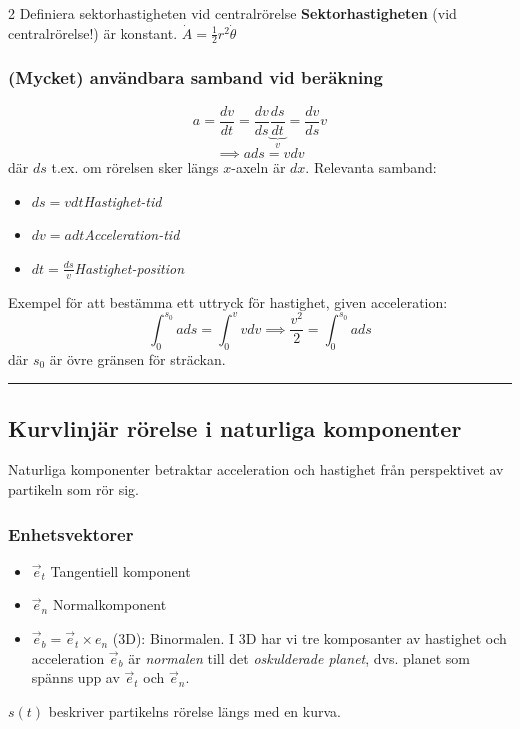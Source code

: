 \documentclass{article}
\newenvironment{ankiflashcard}[1][ ]{}{}
\newcommand{\ruler}{
\rule{0.5\textwidth}{0.5pt}
}
\begin{document}
\begin{paracol}{2}
\begin{ankiflashcard}{Definiera sektorhastigheten vid centralrörelse}
    \textbf{Sektorhastigheten} (vid centralrörelse!) är konstant.
    $\dot A = \frac 1 2 r^2 \dot \theta$
\end{ankiflashcard}
\switchcolumn
\subsubsection{(Mycket) användbara samband vid beräkning}
$$
a=\frac{dv}{dt}=\frac{dv}{ds}\underbrace{\frac{ds}{dt}}_{v} = \frac{dv}{ds}v
$$
$$
\implies \boxed{a ds = v dv}
$$
där $ds$ t.ex. om rörelsen sker längs $x$-axeln är $dx$.
Relevanta samband:
\begin{itemize}
    \item $ds = vdt$\quad\textit{Hastighet-tid}
    \item $dv=a dt$\quad\textit{Acceleration-tid}
    \item $dt=\frac{ds}{v}$\quad\textit{Hastighet-position}
\end{itemize}
Exempel för att bestämma ett uttryck för hastighet, given acceleration:
$$\int_0^{s_0} a ds = \int_0^v v dv\implies \frac{v^2}{2} = \int_0^{s_0} a ds$$
där $s_0$ är övre gränsen för sträckan.
\ruler
\subsection{Kurvlinjär rörelse i naturliga komponenter}
Naturliga komponenter betraktar acceleration och hastighet från perspektivet av partikeln som rör sig.

\subsubsection{Enhetsvektorer}
\begin{itemize}
    \item $\vec e_t$ Tangentiell komponent
    \item  $\vec e_n$ Normalkomponent
    \item $\vec e_b=\vec e_t \times e_n$ (3D): Binormalen. I 3D har vi tre komposanter av hastighet och acceleration $\vec e_b$ är \textit{normalen} till det \textit{oskulderade planet}, dvs. planet som spänns upp av $\vec e_t$ och $\vec e_n$.
\end{itemize}
$s(t)$ beskriver partikelns rörelse längs med en kurva.


\end{paracol}
\end{document}
